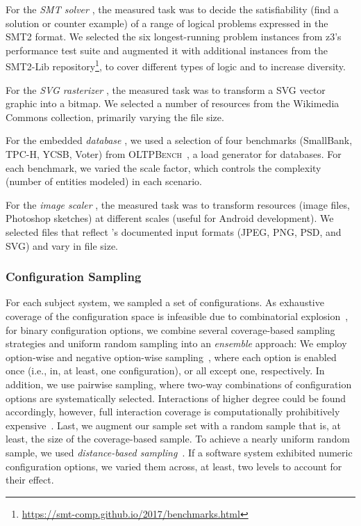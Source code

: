 {{For the \textit{SMT solver} \zdrei, the measured task was to decide the satisfiability (find a solution or counter example) of a range of logical problems expressed in the SMT2 format. We selected the six longest-running problem instances from z3’s performance test suite and augmented it with additional instances from the SMT2-Lib repository\footnote{\url{https://smt-comp.github.io/2017/benchmarks.html}}, to cover different types of logic and to increase diversity.

For the \textit{SVG rasterizer} \batik, the measured task was to transform a SVG vector graphic into a bitmap. We selected a number of resources from the Wikimedia Commons collection, primarily varying the file size.

For the embedded \textit{database} \htwo, we used a selection of four benchmarks (SmallBank, TPC-H, YCSB, Voter) from \textsc{OLTPBench}~\cite{difallah_oltp_2013}, a load generator for databases. For each benchmark, we varied the scale factor, which controls the complexity (number of entities modeled) in each scenario.

For the \textit{image scaler} \dconvert, the measured task was to transform resources (image files, Photoshop sketches) at different scales (useful for Android development). We selected files that reflect \dconvert's documented input formats (JPEG, PNG, PSD, and SVG) and vary in file size.
}

\subsubsection{Configuration Sampling}\label{sec:sampling}
For each subject system, we sampled a set of configurations. As exhaustive coverage of the configuration space is infeasible due to combinatorial explosion~\cite{henardCombining2015}, for binary configuration options, we combine several coverage-based sampling strategies and uniform random sampling into an \emph{ensemble} approach: 
We employ option-wise and negative option-wise sampling~\cite{siegmundPerformanceinfluenceModelsHighly2015}, where each option is enabled once (i.e., in, at least, one configuration), or all except one, respectively. In addition, we use pairwise sampling, where two-way combinations of configuration options are systematically selected. Interactions of higher degree could be found accordingly, however, full interaction coverage is computationally prohibitively expensive~\cite{henardCombining2015}. 
Last, we augment our sample set with a random sample that is, at least, the size of the coverage-based sample. To achieve a nearly uniform random sample, we used \emph{distance-based sampling}~\cite{kaltenecker_distance-based_2019}. If a software system exhibited numeric configuration options, we varied them across, at least, two levels to account for their effect.

}
